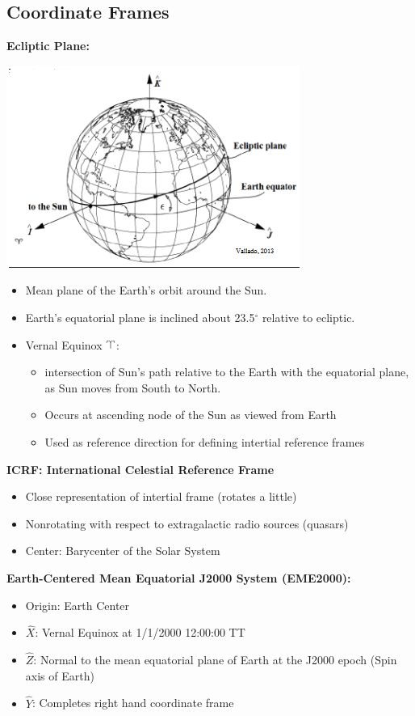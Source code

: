 \documentclass{article}
\begin{document}
\begin{multicols*}{3}
    \subsection*{Coordinate Frames}
    \textbf{Ecliptic Plane:}\par 
    \includegraphics[width=0.5\linewidth]{Figures/ecliptic_plane.png}
    \begin{itemize}
        \item Mean plane of the Earth's orbit around the Sun.
        \item Earth's equatorial plane is inclined about 23.5$^\circ$ relative to ecliptic.
        \item Vernal Equinox $\vernal$: 
            \begin{itemize}
                \item intersection of Sun's path relative to the Earth with the equatorial plane, as Sun moves from South to North.
                \item Occurs at ascending node of the Sun as viewed from Earth
                \item Used as reference direction for defining intertial reference frames
            \end{itemize}
    \end{itemize}

    \textbf{ICRF: International Celestial Reference Frame}\par 
    \begin{itemize}
        \item Close representation of intertial frame (rotates a little)
        \item Nonrotating with respect to extragalactic radio sources (quasars)
        \item Center: Barycenter of the Solar System
    \end{itemize}

    \textbf{Earth-Centered Mean Equatorial J2000 System (EME2000):}
    \begin{itemize}
        \item Origin: Earth Center
        \item $\hat{X}$: Vernal Equinox at 1/1/2000 12:00:00 TT
        \item $\hat{Z}$: Normal to the mean equatorial plane of Earth at the J2000 epoch (Spin axis of Earth)
        \item $\hat{Y}$: Completes right hand coordinate frame
    \end{itemize}


\end{multicols*}
\end{document}
